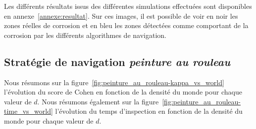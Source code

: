 \documentclass[english,RandD]{rapportPFE}  %
\begin{document}

		Les différents résultats issus des différentes simulations effectuées sont disponibles en annexe~\ref{annexe:resultat}.
		Sur ces images, il est possible de voir en noir les zones réelles de corrosion et en bleu les zones détectées comme comportant de la corrosion par les différents algorithmes de navigation.
		\subsection*{Stratégie de navigation \textit{peinture au rouleau}}
			Nous résumons sur la figure~\ref{fig:peinture_au_rouleau-kappa_vs_world} l'évolution du score de Cohen en fonction de la densité du monde pour chaque valeur de $d$.
			Nous résumons également sur la figure~\ref{fig:peinture_au_rouleau-time_vs_world} l'évolution du temps d'inspection en fonction de la densité du monde pour chaque valeur de $d$.
\end{document}
